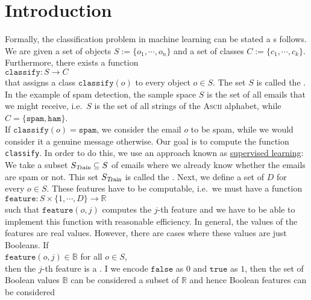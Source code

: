 \section{Introduction}
Formally, the classification problem in machine learning can be stated a s follows.  We are given a
set of objects $S := \{ o_1, \cdots, o_n \}$ and a set of classes $C := \{ c_1, \cdots, c_k \}$.  Furthermore, there exists a function 
\\[0.2cm]
\hspace*{1.3cm}
$\mathtt{classify}: S \rightarrow C$
\\[0.2cm]
that assigns a class $\texttt{classify}(o)$ to every object $o \in S$.  The set $S$ is called the .
In the example of spam detection, the sample space $S$ is the set of all emails that we might receive, i.e.~$S$
is the set of all strings of the \textsc{Ascii} alphabet, while  
\\[0.2cm]
\hspace*{1.3cm}
$C = \{ \mathtt{spam}, \mathtt{ham} \}$.
\\[0.2cm]
If $\mathtt{classify}(o) = \mathtt{spam}$, we consider the email $o$ to be spam, while we would consider it a
genuine message otherwise.  Our goal is to compute the function
\texttt{classify}.  In order to do this, we use an approach known as
\href{https://en.wikipedia.org/wiki/Supervised_learning}{supervised learning}:  We take a subset $S_\textsl{Train} \subseteq S$ of
emails where we already know whether the emails are spam or not.  This set $S_\textsl{Train}$ is called the .
Next, we define a set of $D$  for every $o \in S$.  These features have to be computable,
i.e.~we must have a function
\\[0.2cm]
\hspace*{1.3cm}
$\mathtt{feature}: S \times \{ 1, \cdots, D \} \rightarrow \mathbb{R}$ 
\\[0.2cm]
such that $\mathtt{feature}(o, j)$ computes the $j$-th feature and we have to be able to implement
this function with reasonable efficiency.  In general, the values of the features are real values.
However, there are cases where these values are just 
Booleans.  If
\\[0.2cm]
\hspace*{1.3cm}
$\texttt{feature}(o, j) \in \mathbb{B}$ for all $o \in S$,
\\[0.2cm]
then the $j$-th feature is a .  I we encode $\mathtt{false}$ as $0$ and $\mathtt{true}$ as
$1$, then the set of Boolean values $\mathbb{B}$ can be considered a subset of $\mathbb{R}$ and hence Boolean features can be considered
